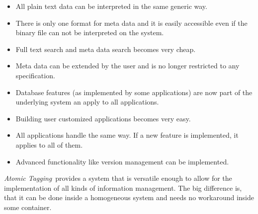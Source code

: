 \documentclass[12pt,a4paper,notitlepage,twocolumn,oneside]{article}
\newcommand{\at}{{\emph{Atomic Tagging}}}
\begin{document}
\begin{itemize}
\item All plain text data can be interpreted in the same generic way. 
\item There is only one format for meta data and it is easily accessible even if the binary file can not be interpreted on the system.
\item Full text search and meta data search becomes very cheap.
\item Meta data can be extended by the user and is no longer restricted to any specification. 
\item Database features (as implemented by some applications) are now part of the underlying system an apply to all applications.
\item Building user customized applications becomes very easy.
\item All applications handle the same way. If a new feature is implemented, it applies to all of them.
\item Advanced functionality like version management can be implemented.
\end{itemize}

\at\ provides a system that is versatile enough to allow for the implementation of all kinds of information management. The big difference is, that it can be done inside a homogeneous system and needs no workaround inside some container.
\end{document}
